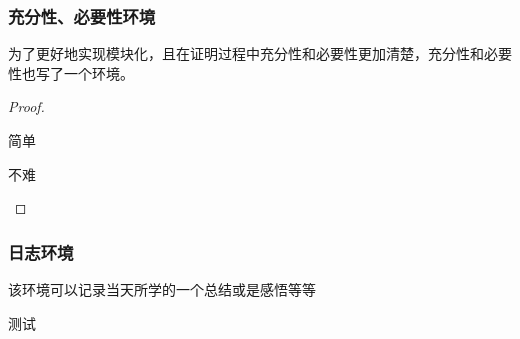 \documentclass{xdyy-usermanual}
\begin{document}
\subsubsection{ 充分性、必要性环境  }

为了更好地实现模块化，且在证明过程中充分性和必要性更加清楚，充分性和必要性也写了一个环境。

\begin{vexample}
    \begin{proof}
      \begin{necessity}
        简单
      \end{necessity}
    
      \begin{sufficiency}
        不难
        \qedhere
      \end{sufficiency}
    \end{proof}
\end{vexample}



\subsubsection{ 日志环境  }

该环境可以记录当天所学的一个总结或是感悟等等

\begin{vexample}
    \begin{timelog}[date = {2022-02-24}]
      测试
    \end{timelog}
\end{vexample}
\end{document}
